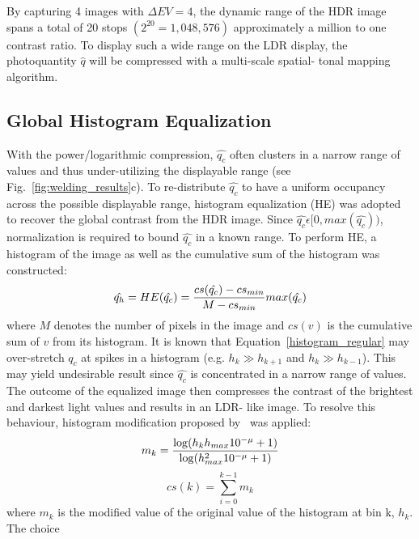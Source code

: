 By capturing 4 images with $\Delta EV=4$, the dynamic range of the HDR image spans a total of 20 
stops $(2^{20}=1,048,576)$ approximately a million to one contrast ratio. To display such a wide 
range on the LDR display, the photoquantity $\hat{q}$ will be compressed with a multi-scale spatial-
tonal mapping algorithm.
%
%

\subsection{Global Histogram Equalization}
With the power/logarithmic compression, $\hat{q_c}$ often clusters in a narrow range of values and 
thus under-utilizing the displayable range (see Fig.~\ref{fig:welding_results}c). To re-distribute $
\hat{q_c}$ to have a uniform occupancy across the possible displayable range, histogram 
equalization (HE) was adopted to recover the global contrast from the HDR image. Since $\hat{q_c}
\epsilon[0,max(\hat{q_c}))$, normalization is required to bound $\hat{q_c}$ in a known range. To 
perform HE, a histogram of the image as well as the cumulative sum of the histogram was 
constructed:
\begin{equation} \label{histogram_regular}
 \hat{q_h}=HE(\hat{q_c})=\frac{cs(\hat{q_c})-cs_{min}}{M-cs_{min}}max(\hat{q_c})\\
\end{equation}
where $M$ denotes the number of pixels in the image and $cs(v)$ is the cumulative sum of $v$ from 
its histogram. It is known that Equation~\ref{histogram_regular} may over-stretch $\hat{q_c}$ at 
spikes in a histogram (e.g. $h_k \gg h_{k+1}$ and $h_k \gg h_{k-1}$). This may yield undesirable 
result since $\hat{q_c}$ is concentrated in a narrow range of values. The outcome of the equalized 
image then compresses the contrast of the brightest and darkest light values and results in an LDR-
like image. To resolve this behaviour, histogram modification proposed by~\cite{lee2012power} was 
applied:
\begin{equation} \label{histogram_regular2}
 m_k=\frac{\log(h_kh_{max}10^{-\mu}+1)}{\log(h_{max}^{2}10^{-\mu}+1)}\\ 
\end{equation}
\begin{equation}
 cs(k)=\displaystyle\sum\limits_{i=0}^{k-1}m_k
\end{equation}
where $m_k$ is the modified value of the original value of the histogram at bin k, $h_k$. The choice 
